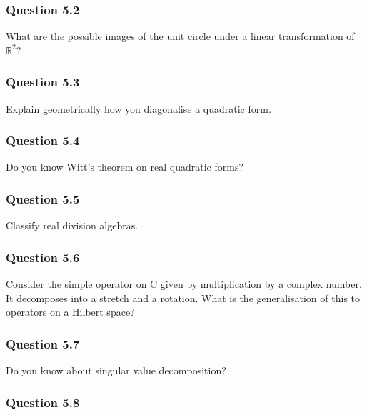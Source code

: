 \hypertarget{question-5.2}{%
\subsubsection{Question 5.2}\label{question-5.2}}

What are the possible images of the unit circle under a linear
transformation of \({\mathbb{R}}^2\)?

\hypertarget{question-5.3}{%
\subsubsection{Question 5.3}\label{question-5.3}}

Explain geometrically how you diagonalise a quadratic form.

\hypertarget{question-5.4}{%
\subsubsection{Question 5.4}\label{question-5.4}}

Do you know Witt's theorem on real quadratic forms?

\hypertarget{question-5.5}{%
\subsubsection{Question 5.5}\label{question-5.5}}

Classify real division algebras.

\hypertarget{question-5.6}{%
\subsubsection{Question 5.6}\label{question-5.6}}

Consider the simple operator on C given by multiplication by a complex
number. It decomposes into a stretch and a rotation. What is the
generalisation of this to operators on a Hilbert space?

\hypertarget{question-5.7}{%
\subsubsection{Question 5.7}\label{question-5.7}}

Do you know about singular value decomposition?

\hypertarget{question-5.8}{%
\subsubsection{Question 5.8}\label{question-5.8}}

